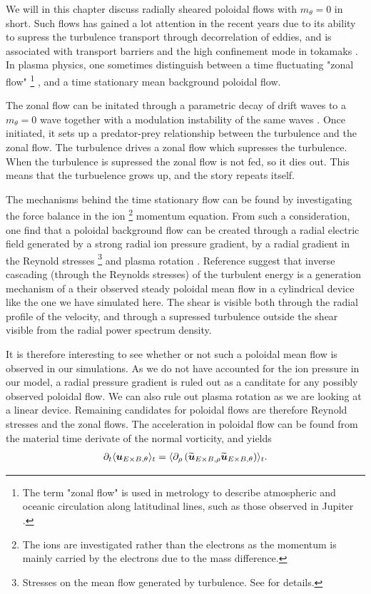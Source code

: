 We will in this chapter discuss radially sheared poloidal flows with $m_\theta = 0$ in short.
Such flows has gained a lot attention in the recent years due to its ability to supress the turbulence transport through decorrelation of eddies, and is associated with transport barriers and the high confinement mode in tokamaks \cite{Terry2000,Diamond2005a,Viezzer2012Phd}.
In plasma physics, one sometimes distinguish between a time fluctuating "zonal flow"%
\footnote{The term "zonal flow" is used in metrology to describe atmospheric and oceanic circulation along latitudinal lines, such as those observed in Jupiter \cite{Limaye1986}.}%
, and a time stationary mean background poloidal flow.

The zonal flow can be initated through a parametric decay of drift waves to a $m_\theta=0$ wave together with a modulation instability of the same waves \cite{Diamond2005a}.
Once initiated, it sets up a predator-prey relationship between the turbulence and the zonal flow.
The turbulence drives a zonal flow which supresses the turbulence.
When the turbulence is supressed the zonal flow is not fed, so it dies out.
This means that the turbuelence grows up, and the story repeats itself.

The mechanisms behind the time stationary flow can be found by investigating the force balance in the ion%
\footnote{The ions are investigated rather than the electrons as the momentum is mainly carried by the electrons due to the mass difference.}
momentum equation.
From such a consideration, one find that a poloidal background flow can be created through a radial electric field generated by a strong radial ion pressure gradient, by a radial gradient in the Reynold stresses
\footnote{Stresses on the mean flow generated by turbulence.
See \cite{Kundu2010book} for details.}%
and plasma rotation \cite{Terry2000}.
Reference \cite{Tynan2006a} suggest that inverse cascading (through the Reynolds stresses) of the turbulent energy is a generation mechanism of a their observed steady poloidal mean flow in a cylindrical device like the one we have simulated here.
The shear is visible both through the radial profile of the velocity, and through a supressed turbulence outside the shear visible from the radial power spectrum density.

It is therefore interesting to see whether or not such a poloidal mean flow is observed in our simulations.
As we do not have accounted for the ion pressure in our model, a radial pressure gradient is ruled out as a canditate for any possibly observed poloidal flow.
We can also rule out plasma rotation as we are looking at a linear device.
Remaining candidates for poloidal flows are therefore Reynold stresses and the zonal flows.
The acceleration in poloidal flow can be found from the material time derivate of the normal vorticity, and yields \cite{Diamond1991}
%
\begin{align*}
    \partial_t \langle{\boldsymbol{u}_{E\times B,\theta}}\rangle_t = \langle{\partial_\rho\left(\widetilde{ \boldsymbol{u}}_{E\times B,\rho}\widetilde{ \boldsymbol{u}}_{E\times B,\theta}\right)}\rangle_t.
\end{align*}
%


